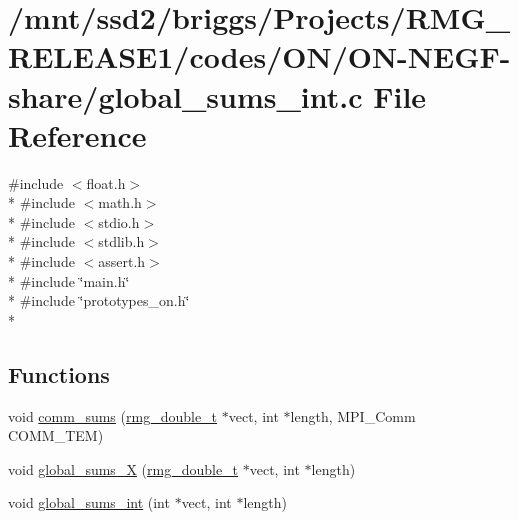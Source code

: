 \hypertarget{_o_n_2_o_n-_n_e_g_f-share_2global__sums__int_8c}{\section{/mnt/ssd2/briggs/\-Projects/\-R\-M\-G\-\_\-\-R\-E\-L\-E\-A\-S\-E1/codes/\-O\-N/\-O\-N-\/\-N\-E\-G\-F-\/share/global\-\_\-sums\-\_\-int.c File Reference}
\label{_o_n_2_o_n-_n_e_g_f-share_2global__sums__int_8c}
}
{\ttfamily \#include $<$float.\-h$>$}\\*
{\ttfamily \#include $<$math.\-h$>$}\\*
{\ttfamily \#include $<$stdio.\-h$>$}\\*
{\ttfamily \#include $<$stdlib.\-h$>$}\\*
{\ttfamily \#include $<$assert.\-h$>$}\\*
{\ttfamily \#include \char`\"{}main.\-h\char`\"{}}\\*
{\ttfamily \#include \char`\"{}prototypes\-\_\-on.\-h\char`\"{}}\\*
\subsection*{Functions}
\begin{DoxyCompactItemize}
\item 
void \hyperlink{_o_n_2_o_n-_n_e_g_f-share_2global__sums__int_8c_a27a0fa3629d0cf28fc7c6609622b158f}{comm\-\_\-sums} (\hyperlink{rmgtypes_8h_aaa16921c14f121c56eaa42390a340db8}{rmg\-\_\-double\-\_\-t} $\ast$vect, int $\ast$length, M\-P\-I\-\_\-\-Comm C\-O\-M\-M\-\_\-\-T\-E\-M)
\item 
void \hyperlink{_o_n_2_o_n-_n_e_g_f-share_2global__sums__int_8c_aed0e33b24398e027b84d158205ecf699}{global\-\_\-sums\-\_\-\-X} (\hyperlink{rmgtypes_8h_aaa16921c14f121c56eaa42390a340db8}{rmg\-\_\-double\-\_\-t} $\ast$vect, int $\ast$length)
\item 
void \hyperlink{_o_n_2_o_n-_n_e_g_f-share_2global__sums__int_8c_a56b65ee5edf5997e05e99457e35ec546}{global\-\_\-sums\-\_\-int} (int $\ast$vect, int $\ast$length)
\end{DoxyCompactItemize}


